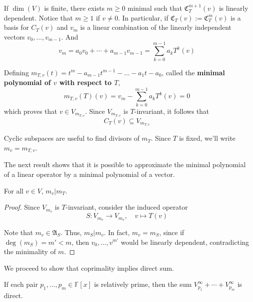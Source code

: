 If $\dim(V)$ is finite, there exists $m \geq 0$ minimal such that $\mathfrak{C}_T^{m+1}(v)$ is linearly dependent. Notice that $m \geq 1$ if $v \neq 0$. In particular, if $\mathfrak{C}_T(v) := \mathfrak{C}_T^{m}(v)$ is a basis for $C_T(v)$ and $v_m$ is a linear combination of the linearly independent vectors $v_0, \ldots, v_{m-1}$. And
\[
	v_m = a_0 v_0 + \cdots + a_{m-1} v_{m-1} = \sum_{k=0}^{m-1} a_k T^k(v)
\]

Defining $m_{T,v}(t) = t^m - a_{m-1}t^{m-1} - \ldots - a_1t - a_0$, called the \textbf{minimal polynomial of $v$ with respect to $T$}, 
\[
	m_{T, v}(T)(v) = v_m - \sum_{k=0}^{m-1} a_k T^k(v) = 0
\]
which proves that $v \in V_{m_{T,v}}$. Since $V_{m_{T,v}}$ is $T$-invariant, it follows that
\[
	C_T(v) \subseteq V_{m_{T,v}}
\]

Cyclic subspaces are useful to find divisors of $m_T$. Since $T$ is fixed, we'll write $m_v = m_{T,v}$. 

The next result shows that it is possible to approximate the minimal polynomial of a linear operator by a minimal polynomial of a vector.

\begin{theorem}
	For all $v \in V$, $m_v | m_T$.
\end{theorem}

\begin{proof}
	Since $V_{m_v}$ is $T$-invariant, consider the induced operator
	\[
		S : V_{m_v} \longrightarrow V_{m_v}, \quad v \mapsto T(v)
	\]
	
	Note that $m_v \in \mathfrak{A}_S$. Thus, $m_S | m_v$. In fact, $m_v = m_S$, since if $\deg(m_S) = m' < m$, then $v_0, \ldots, v^{m'}$ would be linearly dependent, contradicting the minimality of $m$.
\end{proof}

We proceed to show that coprimality implies direct sum.

\begin{theorem}
	If each pair $p_1, \ldots, p_m \in \mathbb{F}[x]$ is relatively prime, then the sum $V_{p_1}^\infty + \cdots + V_{p_m}^\infty$ is direct.
\end{theorem}


